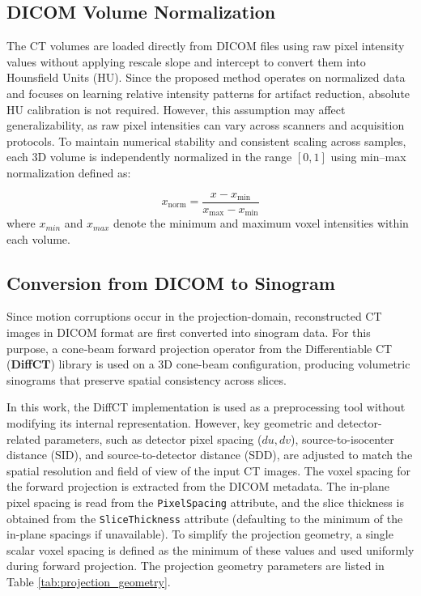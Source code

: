 \subsection{DICOM Volume Normalization}
The CT volumes are loaded directly from DICOM files using raw pixel intensity values without applying rescale slope and intercept to convert them into Hounsfield Units (HU). Since the proposed method operates on normalized data and focuses on learning relative intensity patterns for artifact reduction, absolute HU calibration is not required. However, this assumption may affect generalizability, as raw pixel intensities can vary across scanners and acquisition protocols. 
To maintain numerical stability and consistent scaling across samples, each 3D volume is independently normalized in the range $[0,1]$ using min–max normalization defined as:

\begin{equation}
x_{\mathrm{norm}} = \frac{x - x_{\min}}{x_{\max} - x_{\min}}
\end{equation}
where $x_{min}$ and $x_{max}$ denote the minimum and maximum voxel intensities within each volume.

\subsection{Conversion from DICOM to Sinogram}

Since motion corruptions occur in the projection-domain, reconstructed CT images in DICOM format are first converted into sinogram data. For this purpose, a cone‑beam forward projection operator from the Differentiable CT (\textbf{DiffCT}) library is used \cite{diffct2025} on a 3D cone-beam configuration, producing volumetric sinograms that preserve spatial consistency across slices. 
    
In this work, the DiffCT implementation is used as a preprocessing tool without modifying its internal representation. However, key geometric and detector-related parameters, such as detector pixel spacing ($du, dv$), source-to-isocenter distance (SID), and source-to-detector distance (SDD), are adjusted to match the spatial resolution and field of view of the input CT images. The voxel spacing for the forward projection is extracted from the DICOM metadata. The in-plane pixel spacing is read from the \texttt{PixelSpacing} attribute, and the slice thickness is obtained from the \texttt{SliceThickness} attribute (defaulting to the minimum of the in-plane spacings if unavailable). To simplify the projection geometry, a single scalar voxel spacing is defined as the minimum of these values and used uniformly during forward projection. The projection geometry parameters are listed in Table \ref{tab:projection_geometry}. 

